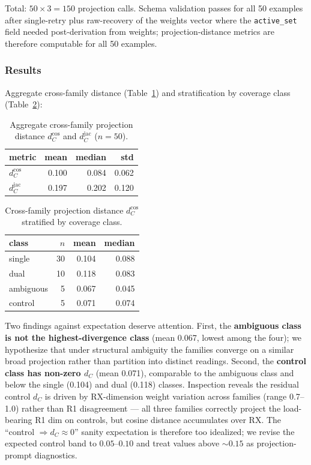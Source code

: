 Total: $50 \times 3 = 150$ projection calls. Schema validation passes for all 50 examples after single-retry plus raw-recovery of the weights vector where the \texttt{active\_set} field needed post-derivation from weights; projection-distance metrics are therefore computable for all 50 examples.

\subsubsection{Results}
\label{sec:results:exp1:results}

Aggregate cross-family distance (Table~\ref{tab:dc_aggregate}) and stratification by coverage class (Table~\ref{tab:dc_by_class}):

\begin{table}[t]
\centering
\caption{Aggregate cross-family projection distance $d_C^{\cos}$ and $d_C^{\text{jac}}$ ($n = 50$).}
\label{tab:dc_aggregate}
\begin{tabular}{lrrr}
\toprule
\textbf{metric} & \textbf{mean} & \textbf{median} & \textbf{std} \\
\midrule
$d_C^{\cos}$    & 0.100 & 0.084 & 0.062 \\
$d_C^{\text{jac}}$ & 0.197 & 0.202 & 0.120 \\
\bottomrule
\end{tabular}
\end{table}

\begin{table}[t]
\centering
\caption{Cross-family projection distance $d_C^{\cos}$ stratified by coverage class.}
\label{tab:dc_by_class}
\begin{tabular}{lrrr}
\toprule
\textbf{class} & $n$ & \textbf{mean} & \textbf{median} \\
\midrule
single    & 30 & 0.104 & 0.088 \\
dual      & 10 & 0.118 & 0.083 \\
ambiguous &  5 & 0.067 & 0.045 \\
control   &  5 & 0.071 & 0.074 \\
\bottomrule
\end{tabular}
\end{table}

Two findings against expectation deserve attention. First, the \textbf{ambiguous class is not the highest-divergence class} (mean 0.067, lowest among the four); we hypothesize that under structural ambiguity the families converge on a similar broad projection rather than partition into distinct readings. Second, the \textbf{control class has non-zero $d_C$} (mean 0.071), comparable to the ambiguous class and below the single (0.104) and dual (0.118) classes. Inspection reveals the residual control $d_C$ is driven by RX-dimension weight variation across families (range 0.7--1.0) rather than R1 disagreement --- all three families correctly project the load-bearing R1 dim on controls, but cosine distance accumulates over RX. The ``control $\Rightarrow d_C \approx 0$'' sanity expectation is therefore too idealized; we revise the expected control band to $0.05$--$0.10$ and treat values above $\sim 0.15$ as projection-prompt diagnostics.

